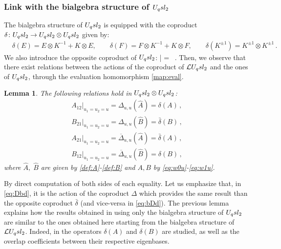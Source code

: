 \documentclass[11pt]{amsart}
\numberwithin{equation}{section}
\newtheorem{lem}[thm]{Lemma}
\numberwithin{equation}{section}
\begin{document}
\subsubsection{Link with the bialgebra structure of $U_q sl_2$}
The bialgebra structure of $U_q sl_2$ is equipped with the coproduct $\delta \colon U_q sl_2 \to U_q sl_2 \otimes U_q sl_2$ given by:
	\begin{align} \label{def:coprod}
		&\delta(E)= E \otimes K^{-1}  + K \otimes E , \qquad \delta(F) =F \otimes K^{-1} + K \otimes F, \qquad \delta(K^{\pm 1}) = K^{ \pm 1} \otimes K^{\pm 1} \,. 
	\end{align}
	We also introduce the opposite coproduct of $U_q sl_2$:
	\beqa
	\bar{\delta}  = \sigma \circ \delta \ .
	\eeqa
Then, we observe that there exist relations between the actions of the coproduct of $\mathcal{L} U_q sl_2$ and the ones of $U_q sl_2$, through the evaluation homomorphism \eqref{map:eval}. 
\begin{lem}\label{lem:Deldel} The following relations hold in $U_q sl_2\otimes U_q sl_2$:
\begin{align}
    A_{12}\big|_{u_1=u_2=u}=\Delta_{u,u}(\widehat{A})=\delta(A)\,,\\
\label{eq:Dbd}      B_{21}\big|_{u_1=u_2=u}=\Delta_{u,u}(\widehat{B})=\bar{\delta}(B)\,,\\
        A_{21}\big|_{u_1=u_2=u}=\overline{\Delta}_{u,u}(\widehat{A})=\bar{\delta}(A)\,,\\
  \label{eq:bDd}          B_{12}\big|_{u_1=u_2=u}=\overline{\Delta}_{u,u}(\widehat{B})=\delta(B)\,,
    \end{align}
    where $\widehat{A},\;\widehat{B}$ are given by \eqref{def:A}-\eqref{def:B} and $A,B$  by \eqref{eq:w0u}-\eqref{eq:w1u}.
\end{lem}
\proof By direct computation of both sides of each equality. \endproof
Let us emphasize that, in \eqref{eq:Dbd}, it is the action of the coproduct $\Delta$ which provides the same result than the opposite coproduct $\bar{\delta}$ (and vice-versa in \eqref{eq:bDd}).
The previous lemma explains how the results obtained in \cite{G25} using only the bialgebra structure of $U_q sl_2$ are similar to the ones obtained here starting from the bialgebra structure of $\mathcal{L} U_q sl_2$. Indeed, in \cite{G25} the operators $\delta(A)$ and $\delta(B)$ are studied, as well as the overlap coefficients between their respective eigenbases.
\end{document}
